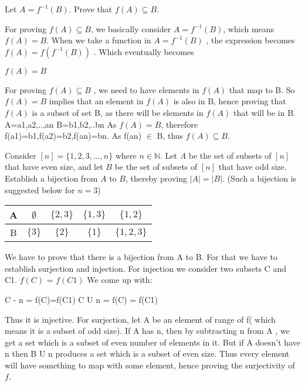 \documentclass[addpoints]{exam}
\begin{document}
\begin{questions}
\question[15] Let $A = f^{-1}(B)$. Prove that $f(A) \subseteq B$.
  \begin{solution}
    For proving $f(A) \subseteq B$, we basically consider $A=f^{-1}(B)$, which means $f(A)=B$. \newline
    When we take a function in $A = f^{-1}(B)$ , the expression becomes $f(A) = f(f^{-1}(B))$ . Which eventually becomes \newline
    \begin{center}
    $f(A)=B$    
    \end{center}
    For proving $f(A) \subseteq B$ , we need to have elements in $f(A)$ that map to B. So $f(A)=B$ implies that an element in $f(A)$ is also in B, hence proving that $f(A)$ is a subset of set B, as there will be elements in $f(A)$ that will be in B.\newline
    A={a1,a2,..,an}\newline
    B={b1,b2,..bn} \newline
    As $f(A)=B$, therefore f(a1)=b1,f(a2)=b2,f(an)=bn. As f(an) $\in$ B, thus $f(A) \subseteq B.$
  \end{solution}

\question[15] Consider $[n] = \{1,2,3,...,n\}$ where $n \in \mathbb{N}$. Let $A$ be the set of subsets of $[n]$ that have even size, and let $B$ be the set of subsets of $[n]$ that have odd size. Establish a bijection from $A$ to $B$, thereby proving $|A| = |B|$. (Such a bijection is suggested below for $n = 3$) 

\begin{center}

  \begin{tabular}{ |c || c | c | c |c |}
    \hline
 A & $\emptyset$ & $\{2,3\}$ & $\{1,3\}$ & $\{1,2\}$ \\ \hline
 B & $\{3\}$ & $\{2\}$ & $\{1\}$ & $\{1,2,3\}$\\\hline
\end{tabular}
\end{center}

  \begin{solution}
    We have to prove that there is a bijection from A to B. For that we have to establish surjection and injection. For injection we consider two subsets C and C1. $f(C)$ = $f(C1)$
    We come up with: 
    \begin{center}
        C - {n} = f(C)=f(C1)
        C U {n} = f(C) = f(C1)
    \end{center}
    Thus it is injective. For surjection, let A be an element of range of f( which means it is a subset of odd size). If A has n, then by subtracting n from A , we get a set which is a subset of even number of elements in it. But if A doesn't have n then B U {n} produces a set which is a subset of even size. Thus every element will have something to map with some element, hence proving the surjectivity of $f$.  
  \end{solution}
  

\end{questions}
\end{document}
